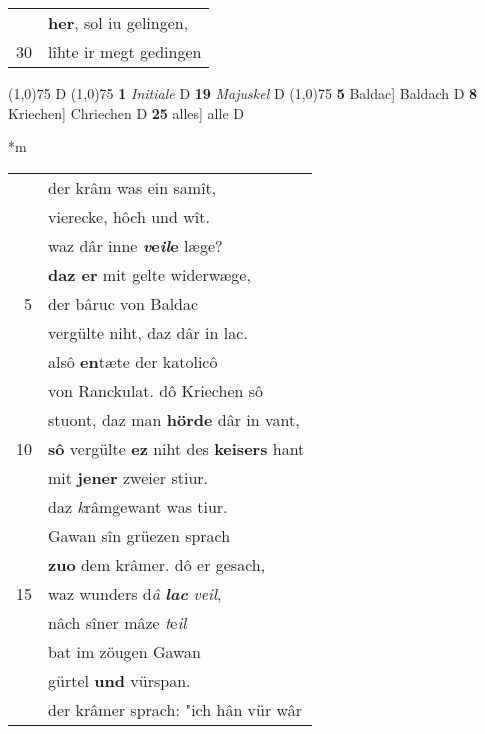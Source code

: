 \documentclass[8pt,a4paper,notitlepage]{article}
\begin{document}
\begin{table}[ht]
\begin{minipage}[t]{0.5\linewidth}
\begin{tabular}{rl}
 & \textbf{her}, sol iu gelingen,\\ 
30 & lîhte ir megt gedingen\\ 
\end{tabular}
\scriptsize
\line(1,0){75} \newline
D \newline
\line(1,0){75} \newline
\textbf{1} \textit{Initiale} D  \textbf{19} \textit{Majuskel} D  \newline
\line(1,0){75} \newline
\textbf{5} Baldac] Baldach D \textbf{8} Kriechen] Chriechen D \textbf{25} alles] alle D \newline
\end{minipage}
\hspace{0.5cm}
\begin{minipage}[t]{0.5\linewidth}
\small
\begin{center}*m
\end{center}
\begin{tabular}{rl}
 & der krâm was ein samît,\\ 
 & vierecke, hôch und wît.\\ 
 & waz dâr inne \textbf{\textit{v}e\textit{il}e} læge?\\ 
 & \textbf{daz er} mit gelte widerwæge,\\ 
5 & der bâruc von Baldac\\ 
 & vergülte niht, daz dâr in lac.\\ 
 & alsô \textbf{en}tæte der katolicô\\ 
 & von Ranckulat. dô Kriechen sô\\ 
 & stuont, daz man \textbf{hörde} dâr in vant,\\ 
10 & \textbf{sô} vergülte \textbf{ez} niht des \textbf{keisers} hant\\ 
 & mit \textbf{jener} zweier stiur.\\ 
 & daz \textit{k}râmgewant was tiur.\\ 
 & Gawan sîn grüezen sprach\\ 
 & \textbf{zuo} dem krâmer. dô er gesach,\\ 
15 & waz wunders d\textit{â} \textit{\textbf{lac}} \textit{veil},\\ 
 & nâch sîner mâze \textit{t}e\textit{il}\\ 
 & bat im zöugen Gawan\\ 
 & gürtel \textbf{und} vürspan.\\ 
 & der krâmer sprach: "ich hân vür wâr\\ 

\end{tabular}
\end{minipage}
\end{table}
\end{document}
